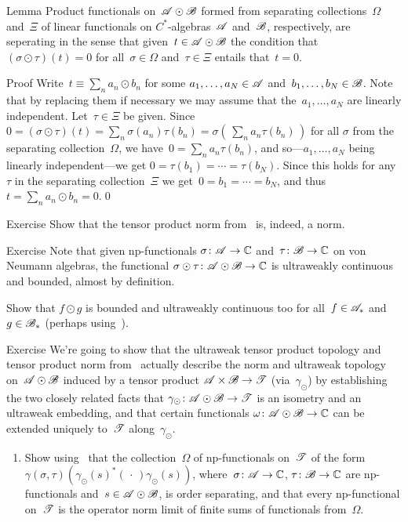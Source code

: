 \documentclass[a]{subfiles}
\begin{document}
\begin{parsec}
\begin{point}{Lemma}
Product functionals on~$\mathscr{A}\odot\mathscr{B}$
formed from 
separating
collections~$\Omega$ and~$\Xi$ 
of linear functionals
on $C^*$-algebras~$\mathscr{A}$ and~$\mathscr{B}$,
respectively,
are seperating
in the sense that given~$t\in\mathscr{A}\odot\mathscr{B}$
the condition that $(\sigma\odot \tau)(t)=0$
for all~$\sigma\in \Omega$ and~$\tau\in\Xi$
entails that~$t=0$.
\begin{point}{Proof}%
Write~$t\equiv \sum_n a_n\odot b_n$
for some  $a_1,\dotsc,a_N\in\mathscr{A}$
and~$b_1,\dotsc,b_N\in \mathscr{B}$.
Note that by replacing them if necessary
we may assume that the~$a_1,\dotsc,a_N$
are linearly independent.
Let~$\tau\in\Xi$ be given.
Since~$0=(\sigma\odot \tau)(t)
= \sum_n\sigma(a_n)\tau(b_n)
= \sigma(\,\sum_n a_n\tau(b_n)\,)$
for all $\sigma$ from the separating collection~$\Omega$,
we have~$0=\sum_n a_n\tau(b_n)$,
and so---$a_1,\dotsc,a_N$ being linearly independent---we get
 $0=\tau(b_1)=\dotsb = \tau(b_N)$.
Since this holds for any~$\tau$
in the separating collection~$\Xi$
we get~$0=b_1=\dotsb=b_N$,
and thus~$t=\sum_n a_n\odot b_n=0$.\qed
\end{point}
\end{point}
\begin{point}{Exercise}%
Show that the tensor product norm
from~
is, indeed, a norm.
\end{point}
\begin{point}{Exercise}%
Note that given np-functionals 
$\sigma \colon \mathscr{A}\to\mathbb{C}$
and~$\tau\colon \mathscr{B}\to\mathbb{C}$
on von Neumann algebras,
the functional $\sigma\odot\tau\colon \mathscr{A}\odot\mathscr{B}\to\mathbb{C}$
is ultraweakly continuous and bounded,
almost by definition.

Show that $f\odot g$ is
bounded and ultraweakly continuous too
for all~$f\in\mathscr{A}_*$ and~$g\in\mathscr{B}_*$
(perhaps using~).
\end{point}
\begin{point}{Exercise}%
We're going to show that 
the ultraweak tensor product topology
and tensor product norm from~
actually describe the norm and ultraweak topology
on~$\mathscr{A}\odot\mathscr{B}$ induced by a tensor product
$\mathscr{A}\times\mathscr{B}\to\mathscr{T}$ (via~$\gamma_\odot$)
by establishing
the two closely related facts that
$\gamma_\odot\colon\mathscr{A}\odot\mathscr{B}\to\mathscr{T}$
is an isometry
and an ultraweak embedding,
and that certain
functionals 
$\omega\colon \mathscr{A}\odot\mathscr{B}\to\mathbb{C}$
can be extended uniquely to~$\mathscr{T}$ along~$\gamma_\odot$.
\begin{enumerate}
\item
Show using~
that the collection~$\Omega$
of np-functionals
on~$\mathscr{T}$ of the form 
$\gamma(\sigma,\tau)(\gamma_\odot(s)^*(\,\cdot\,)\gamma_\odot(s))$,
where~$\sigma\colon \mathscr{A}\to\mathbb{C}$,
$\tau\colon \mathscr{B}\to\mathbb{C}$
are np-functionals
and~$s\in\mathscr{A}\odot\mathscr{B}$,
is order separating,
and that
every np-functional on~$\mathscr{T}$
is the operator norm limit of finite sums
of functionals from~$\Omega$.


\end{enumerate}
\end{point}
\end{parsec}
\end{document}
